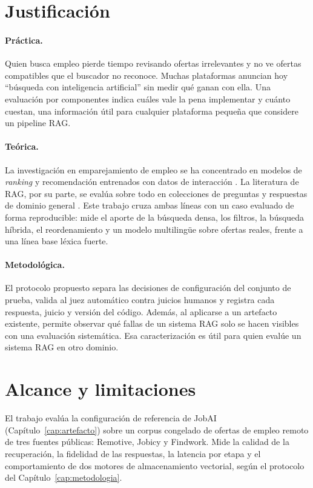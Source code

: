 \section{Justificación}

\paragraph{Práctica.} Quien busca empleo pierde tiempo revisando ofertas irrelevantes y no ve ofertas compatibles que el buscador no reconoce. Muchas plataformas anuncian hoy \enquote{búsqueda con inteligencia artificial} sin medir qué ganan con ella. Una evaluación por componentes indica cuáles vale la pena implementar y cuánto cuestan, una información útil para cualquier plataforma pequeña que considere un pipeline RAG.

\paragraph{Teórica.} La investigación en emparejamiento de empleo se ha concentrado en modelos de \textit{ranking} y recomendación entrenados con datos de interacción \citep{HaThuc2017,Shen2024,Bocharova2023}. La literatura de RAG, por su parte, se evalúa sobre todo en colecciones de preguntas y respuestas de dominio general \citep{Gao2023}. Este trabajo cruza ambas líneas con un caso evaluado de forma reproducible: mide el aporte de la búsqueda densa, los filtros, la búsqueda híbrida, el reordenamiento y un modelo multilingüe sobre ofertas reales, frente a una línea base léxica fuerte.

\paragraph{Metodológica.} El protocolo propuesto separa las decisiones de configuración del conjunto de prueba, valida al juez automático contra juicios humanos y registra cada respuesta, juicio y versión del código. Además, al aplicarse a un artefacto existente, permite observar qué fallas de un sistema RAG solo se hacen visibles con una evaluación sistemática. Esa caracterización es útil para quien evalúe un sistema RAG en otro dominio.

\section{Alcance y limitaciones}

El trabajo evalúa la configuración de referencia de JobAI (Capítulo~\ref{cap:artefacto}) sobre un corpus congelado de ofertas de empleo remoto de tres fuentes públicas: Remotive, Jobicy y Findwork. Mide la calidad de la recuperación, la fidelidad de las respuestas, la latencia por etapa y el comportamiento de dos motores de almacenamiento vectorial, según el protocolo del Capítulo~\ref{cap:metodologia}.

